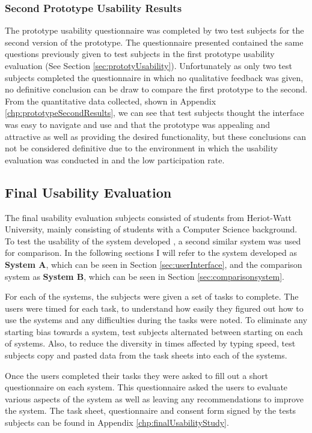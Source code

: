 \subsubsection{Second Prototype Usability Results}
The prototype usability questionnaire was completed by two test subjects for the second version of the prototype. The questionnaire presented contained the same questions previously given to test subjects in the first prototype usability evaluation (See Section \ref{sec:prototyUsability}). Unfortunately as only two test subjects completed the questionnaire in which no qualitative feedback was given, no definitive conclusion can be draw to compare the first prototype to the second. From the quantitative data collected, shown in Appendix \ref{chp:prototypeSecondResults}, we can see that test subjects thought the interface was easy to navigate and use and that the prototype was appealing and attractive as well as providing the desired functionality, but these conclusions can not be considered definitive due to the environment in which the usability evaluation was conducted in and the low participation rate.  


\subsection{Final Usability Evaluation}\label{sec:finalUsability}
The final usability evaluation subjects consisted of students from Heriot-Watt University, mainly consisting of students with a Computer Science background. To test the usability of the system developed , a second similar system was used for comparison. In the following sections I will refer to the system developed as \textbf{System A}, which can be seen in Section \ref{sec:userInterface}, and the comparison system as \textbf{System B}, which can be seen in Section \ref{sec:comparisonsystem}.

For each of the systems, the subjects were given a set of tasks to complete. The users were timed for each task, to understand how easily they figured out how to use the systems and any difficulties during the tasks were noted. To eliminate any starting bias towards a system, test subjects alternated between starting on each of systems. Also, to reduce the diversity in times affected by typing speed, test subjects copy and pasted data from the task sheets into each of the systems.

Once the users completed their tasks they were asked to fill out a short questionnaire on each system. This questionnaire asked the users to evaluate various aspects of the system as well as leaving any recommendations to improve the system. The task sheet, questionnaire and consent form signed by the tests subjects can be found in Appendix \ref{chp:finalUsabilityStudy}. 

